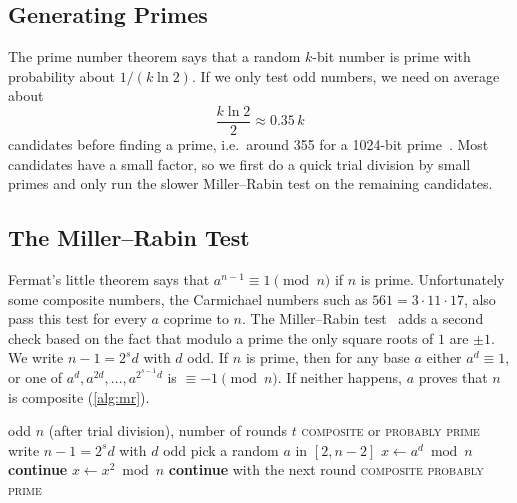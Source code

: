 \documentclass[runningheads]{llncs}
\begin{document}
\subsection{Generating Primes}

The prime number theorem says that a random $k$-bit number is prime with
probability about $1/(k \ln 2)$. If we only test odd numbers, we need on
average about
\begin{equation}\label{eq:pnt}
  \frac{k \ln 2}{2} \approx 0.35\,k
\end{equation}
candidates before finding a prime, i.e.\ around 355 for a 1024-bit
prime~\cite{hac1996}. Most candidates have a small factor, so we first do a
quick trial division by small primes and only run the slower Miller--Rabin
test on the remaining candidates.

\subsection{The Miller--Rabin Test}

Fermat's little theorem says that $a^{n-1} \equiv 1 \pmod n$ if $n$ is prime.
Unfortunately some composite numbers, the Carmichael numbers such as
$561 = 3 \cdot 11 \cdot 17$, also pass this test for every $a$ coprime to
$n$. The Miller--Rabin test~\cite{miller1976,rabin1980} adds a second check
based on the fact that modulo a prime the only square roots of $1$ are $\pm1$.
We write $n-1 = 2^s d$ with $d$ odd. If $n$ is prime, then for any base $a$
either $a^d \equiv 1$, or one of $a^d, a^{2d}, \dots, a^{2^{s-1}d}$ is
$\equiv -1 \pmod n$. If neither happens, $a$ proves that $n$ is composite
(\cref{alg:mr}).

\begin{algorithm}[t]
\caption{Miller--Rabin test with $t$ random bases.}\label{alg:mr}
\begin{algorithmic}[1]
\Require odd $n$ (after trial division), number of rounds $t$
\Ensure \textsc{composite} or \textsc{probably prime}
\State write $n-1 = 2^s d$ with $d$ odd
  \State pick a random $a$ in $[2, n-2]$
  \State $x \gets a^d \bmod n$
   \textbf{continue} \EndIf
    \State $x \gets x^2 \bmod n$
     \textbf{continue} with the next round \EndIf
  \EndFor
  \State \Return \textsc{composite}
\EndFor
\State \Return \textsc{probably prime}
\end{algorithmic}
\end{algorithm}
\end{document}
